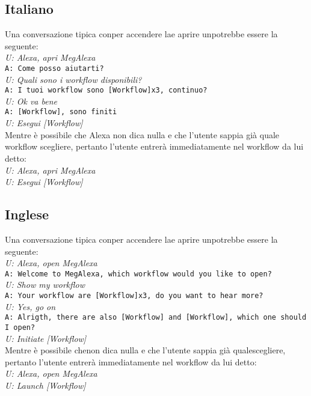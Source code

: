 \subsection{Italiano}
Una conversazione tipica conper accendere lae aprire unpotrebbe essere la seguente:\\
\newline
\textit{U: Alexa, apri MegAlexa} \\
\texttt{A: Come posso aiutarti?} \\
\textit{U: Quali sono i workflow disponibili?} \\
\texttt{A: I tuoi workflow sono [Workflow]x3, continuo?} \\
\textit{U: Ok va bene} \\
\texttt{A: [Workflow], sono finiti} \\
\textit{U: Esegui [Workflow]} \\
\newline
Mentre è possibile che Alexa non dica nulla e che l'utente sappia già quale workflow scegliere, pertanto l'utente entrerà immediatamente nel workflow da lui detto: \\
\newline
\textit{U: Alexa, apri MegAlexa}\\
\textit{U: Esegui [Workflow]}

\subsection{Inglese}
Una conversazione tipica conper accendere lae aprire unpotrebbe essere la seguente:\\
\newline
\textit{U: Alexa, open MegAlexa} \\
\texttt{A: Welcome to MegAlexa, which workflow would you like to open?}\\
\textit{U: Show my workflow}\\
\texttt{A: Your workflow are [Workflow]x3, do you want to hear more?}\\
\textit{U: Yes, go on}\\
\texttt{A: Alrigth, there are also [Workflow] and [Workflow], which one should I open?}\\
\textit{U: Initiate [Workflow]} \\
\newline
Mentre è possibile chenon dica nulla e che l'utente sappia già qualescegliere, pertanto l'utente entrerà immediatamente nel workflow da lui detto: \\
\newline
\textit{U: Alexa, open MegAlexa}\\
\textit{U: Launch [Workflow]}

